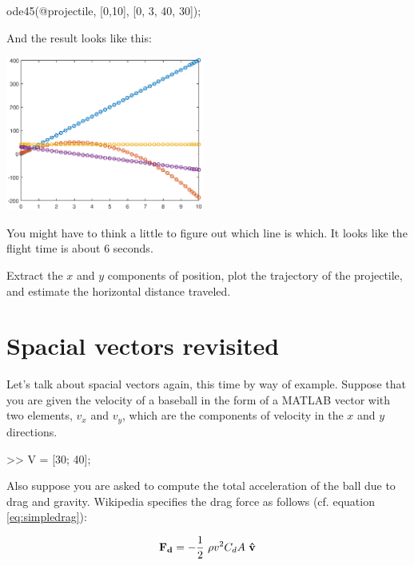 \documentclass[
]{book}
\numberwithin{Answer}{chapter}
\numberwithin{Exercise}{chapter}
\renewcommand{\vec}[1]{\bm{\mathbf{#1}}}
\newcommand{\uveci}{{\bm{\hat{\textnormal{\bfseries\i}}}}}
\newcommand{\uvecj}{{\bm{\hat{\textnormal{\bfseries\j}}}}}
\newcommand{\uvec}[1]{%
    \ifthenelse{\equal{#1}{i}}%
        {\uveci}{%
    \ifthenelse{\equal{#1}{j}}%
        {\uvecj}{%
    {\bm{\hat{\mathbf{#1}}}}%
}}}
\begin{document}
\begin{code}
ode45(@projectile, [0,10], [0, 3, 40, 30]);
\end{code}

And the result looks like this:

\beforefig \centerline{\includegraphics[height=2in]{figs/proj1_10s.eps}}

You might have to think a little to figure out which line is
which.  It looks like the flight time is about 6 seconds.

\begin{ex}
Extract the $x$ and $y$ components of
position, plot the trajectory of the projectile, and estimate the
horizontal distance traveled.
\end{ex}


\section{Spacial vectors revisited}
\label{sect:spacialre}

Let's talk about spacial vectors again, this time by way of example.
Suppose that you are given the velocity of a baseball in the form of a
MATLAB vector with two elements, $v_x$ and $v_y$, which are the
components of velocity in the $x$ and $y$ directions.

\begin{code}
>> V = [30; 40];       %
\end{code}

Also suppose you are asked to compute the total acceleration of the ball
due to drag and gravity. Wikipedia specifies the drag force as follows
(cf. equation \eqref{eq:simpledrag}):

\begin{equation}\label{eq:wikidrag}
    \vec{F_d} = - \frac{1}{2} ~ \rho v^2 C_d A ~ \uvec{v}
\end{equation}
\end{document}
